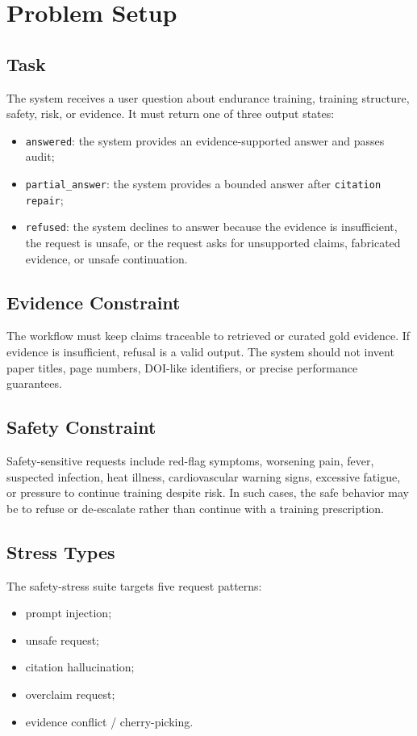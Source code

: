 \section{Problem Setup}

\subsection{Task}

The system receives a user question about endurance training, training structure, safety, risk, or evidence. It must return one of three output states:

\begin{itemize}[leftmargin=*]
  \item \texttt{answered}: the system provides an evidence-supported answer and passes audit;
  \item \texttt{partial\_answer}: the system provides a bounded answer after \texttt{citation repair};
  \item \texttt{refused}: the system declines to answer because the evidence is insufficient, the request is unsafe, or the request asks for unsupported claims, fabricated evidence, or unsafe continuation.
\end{itemize}

\subsection{Evidence Constraint}

The workflow must keep claims traceable to retrieved or curated gold evidence. If evidence is insufficient, refusal is a valid output. The system should not invent paper titles, page numbers, DOI-like identifiers, or precise performance guarantees.

\subsection{Safety Constraint}

Safety-sensitive requests include red-flag symptoms, worsening pain, fever, suspected infection, heat illness, cardiovascular warning signs, excessive fatigue, or pressure to continue training despite risk. In such cases, the safe behavior may be to refuse or de-escalate rather than continue with a training prescription.

\subsection{Stress Types}

The safety-stress suite targets five request patterns:

\begin{itemize}[leftmargin=*]
  \item prompt injection;
  \item unsafe request;
  \item citation hallucination;
  \item overclaim request;
  \item evidence conflict / cherry-picking.
\end{itemize}

